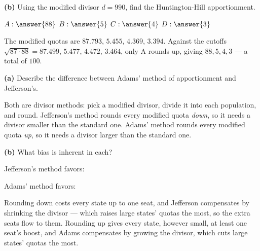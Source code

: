 \documentclass[12pt]{ximera}
\begin{document}
\begin{problem}
\begin{prompt}
\textbf{(b)} Using the modified divisor $d=990$, find the Huntington-Hill apportionment.

$A:\answer{88}$ \quad $B:\answer{5}$ \quad $C:\answer{4}$ \quad $D:\answer{3}$

\begin{feedback}
The modified quotas are $87.793$, $5.455$, $4.369$, $3.394$. Against the cutoffs
$\sqrt{87\cdot 88}=87.499$, $5.477$, $4.472$, $3.464$, only A rounds up, giving
$88, 5, 4, 3$ --- a total of $100$. \checkmark
\end{feedback}
\end{prompt}
\end{problem}

\begin{problem}
\begin{prompt}
\textbf{(a)} Describe the difference between Adams' method of apportionment and
Jefferson's.

\begin{freeResponse}
\end{freeResponse}

\begin{feedback}
Both are divisor methods: pick a modified divisor, divide it into each population, and
round. Jefferson's method rounds every modified quota \emph{down}, so it needs a divisor
smaller than the standard one. Adams' method rounds every modified quota \emph{up}, so it
needs a divisor larger than the standard one.
\end{feedback}
\end{prompt}

\begin{prompt}
\textbf{(b)} What bias is inherent in each?

Jefferson's method favors:
\begin{multipleChoice}
\end{multipleChoice}

Adams' method favors:
\begin{multipleChoice}
\end{multipleChoice}

\begin{feedback}
Rounding down costs every state up to one seat, and Jefferson compensates by shrinking
the divisor --- which raises large states' quotas the most, so the extra seats flow to
them. Rounding up gives every state, however small, at least one seat's boost, and
Adams compensates by growing the divisor, which cuts large states' quotas the most.
\end{feedback}
\end{prompt}


\end{problem}
\end{document}
